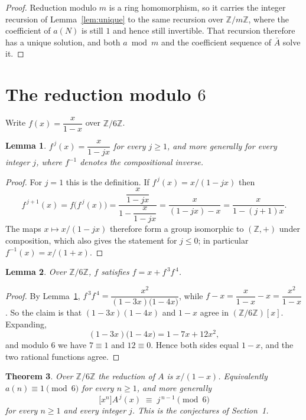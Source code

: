 \documentclass[11pt,a4paper]{article}
\theoremstyle{plain}
\newtheorem{theorem}{Theorem}
\newtheorem{lemma}[theorem]{Lemma}
\theoremstyle{definition}
\begin{document}
\begin{proof}
Reduction modulo $m$ is a ring homomorphism, so it carries the integer recursion of
Lemma~\ref{lem:unique} to the same recursion over $\mathbb{Z}/m\mathbb{Z}$, where the
coefficient of $a(N)$ is still $1$ and hence still invertible. That recursion therefore has
a unique solution, and both $a\bmod m$ and the coefficient sequence of $\bar A$ solve it.
\end{proof}

\section{The reduction modulo $6$}

Write $f(x)=\dfrac{x}{1-x}$ over $\mathbb{Z}/6\mathbb{Z}$.

\begin{lemma}\label{lem:iter}
$f^{\,j}(x)=\dfrac{x}{1-jx}$ for every $j\ge1$, and more generally for every integer
$j$, where $f^{-1}$ denotes the compositional inverse.
\end{lemma}

\begin{proof}
For $j=1$ this is the definition. If $f^{\,j}(x)=x/(1-jx)$ then
\[
f^{\,j+1}(x)=f\bigl(f^{\,j}(x)\bigr)
=\frac{\dfrac{x}{1-jx}}{1-\dfrac{x}{1-jx}}
=\frac{x}{(1-jx)-x}=\frac{x}{1-(j+1)x} .
\]
The maps $x\mapsto x/(1-jx)$ therefore form a group isomorphic to $(\mathbb{Z},+)$ under
composition, which also gives the statement for $j\le0$; in particular
$f^{-1}(x)=x/(1+x)$.
\end{proof}

\begin{lemma}\label{lem:sat}
Over $\mathbb{Z}/6\mathbb{Z}$, $f$ satisfies $f=x+f^{\,3}f^{\,4}$.
\end{lemma}

\begin{proof}
By Lemma~\ref{lem:iter}, $f^{\,3}f^{\,4}
=\dfrac{x^{2}}{(1-3x)\bigl(1-4x\bigr)}$, while
$f-x=\dfrac{x}{1-x}-x=\dfrac{x^{2}}{1-x}$. So the claim is that
$(1-3x)(1-4x)$ and $1-x$ agree in $(\mathbb{Z}/6\mathbb{Z})[x]$. Expanding,
\[
(1-3x)\bigl(1-4x\bigr)=1-7x+12x^{2} ,
\]
and modulo $6$ we have $7\equiv1$ and $12\equiv0$. Hence both sides equal
$1-x$, and the two rational functions agree.
\end{proof}


\begin{theorem}\label{thm:main}
Over $\mathbb{Z}/6\mathbb{Z}$ the reduction of $A$ is $x/(1-x)$. Equivalently
$a(n)\equiv1\pmod{6}$ for every $n\ge1$, and more generally
\[
\bigl[x^{n}\bigr]A^{\,j}(x)\;\equiv\;j^{\,n-1}\pmod{6}
\]
for every $n\ge1$ and every integer $j$. This is the conjectures of Section~1.
\end{theorem}
\end{document}
